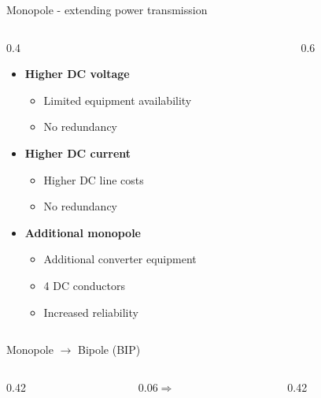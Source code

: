 \begin{frame}{Monopole - extending power transmission}
  \begin{columns}[c,onlytextwidth]
    \begin{column}{0.4\textwidth}
      \begin{itemize}
        \setlength{\itemsep}{0.3em}
        \item \textbf{Higher DC voltage}
            \begin{itemize}
              \item Limited equipment availability
              \item No redundancy
            \end{itemize}
        \item \textbf{Higher DC current}
            \begin{itemize}
              \item Higher DC line costs
              \item No redundancy
            \end{itemize}
        \item \textbf{Additional monopole}
            \begin{itemize}
              \item Additional converter equipment
              \item 4 DC conductors
              \item Increased reliability
            \end{itemize}
      \end{itemize}
    \end{column}
    \begin{column}{0.6\textwidth}\centering
      \\[0.4em]
    \end{column}
  \end{columns}
\end{frame}

\begin{frame}{Monopole $\rightarrow$ Bipole (BIP)}
  \centering
  \begin{columns}[c,onlytextwidth]
    \begin{column}{0.42\textwidth}\centering
      \\[0.4em]
    \end{column}
    \begin{column}{0.06\textwidth}\centering $\Rightarrow$ \end{column}
    \begin{column}{0.42\textwidth}\centering
    \end{column}
  \end{columns}
\end{frame}

